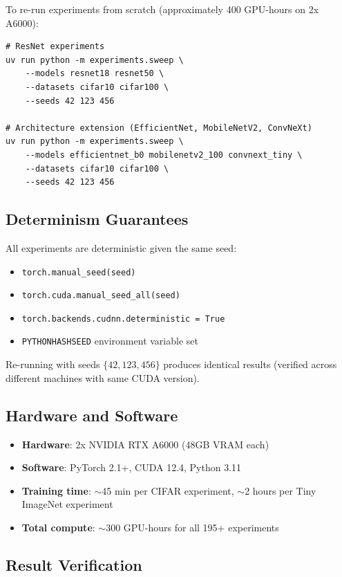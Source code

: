 \documentclass[10pt]{article}
\begin{document}
To re-run experiments from scratch (approximately 400 GPU-hours on 2x A6000):
\begin{verbatim}
# ResNet experiments
uv run python -m experiments.sweep \
    --models resnet18 resnet50 \
    --datasets cifar10 cifar100 \
    --seeds 42 123 456

# Architecture extension (EfficientNet, MobileNetV2, ConvNeXt)
uv run python -m experiments.sweep \
    --models efficientnet_b0 mobilenetv2_100 convnext_tiny \
    --datasets cifar10 cifar100 \
    --seeds 42 123 456
\end{verbatim}

\subsection{Determinism Guarantees}

All experiments are deterministic given the same seed:
\begin{itemize}
    \item \texttt{torch.manual\_seed(seed)}
    \item \texttt{torch.cuda.manual\_seed\_all(seed)}
    \item \texttt{torch.backends.cudnn.deterministic = True}
    \item \texttt{PYTHONHASHSEED} environment variable set
\end{itemize}

Re-running with seeds $\{42, 123, 456\}$ produces identical results (verified across different machines with same CUDA version).

\subsection{Hardware and Software}

\begin{itemize}
    \item \textbf{Hardware}: 2x NVIDIA RTX A6000 (48GB VRAM each)
    \item \textbf{Software}: PyTorch 2.1+, CUDA 12.4, Python 3.11
    \item \textbf{Training time}: $\sim$45 min per CIFAR experiment, $\sim$2 hours per Tiny ImageNet experiment
    \item \textbf{Total compute}: $\sim$300 GPU-hours for all 195+ experiments
\end{itemize}

\subsection{Result Verification}
\end{document}
